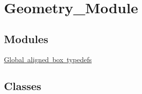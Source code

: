 \hypertarget{group___geometry___module}{}\section{Geometry\+\_\+\+Module}
\label{group___geometry___module}
\subsection*{Modules}
\begin{DoxyCompactItemize}
\item 
\mbox{\hyperlink{group__alignedboxtypedefs}{Global aligned box typedefs}}
\end{DoxyCompactItemize}
\subsection*{Classes}
